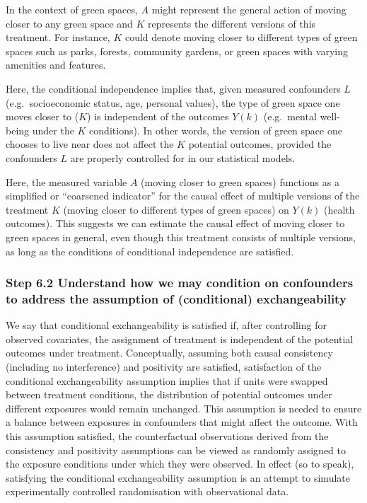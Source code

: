 \documentclass[
  singlecolumn]{article}
\begin{document}
In the context of green spaces, \(A\) might represent the general action
of moving closer to any green space and \(K\) represents the different
versions of this treatment. For instance, \(K\) could denote moving
closer to different types of green spaces such as parks, forests,
community gardens, or green spaces with varying amenities and features.

Here, the conditional independence implies that, given measured
confounders \(L\) (e.g.~socioeconomic status, age, personal values), the
type of green space one moves closer to (\(K\)) is independent of the
outcomes \(Y(k)\) (e.g.~mental well-being under the \(K\) conditions).
In other words, the version of green space one chooses to live near does
not affect the \(K\) potential outcomes, provided the confounders \(L\)
are properly controlled for in our statistical models.

Here, the measured variable \(A\) (moving closer to green spaces)
functions as a simplified or ``coarsened indicator'' for the causal
effect of multiple versions of the treatment \(K\) (moving closer to
different types of green spaces) on \(Y(k)\) (health outcomes). This
suggests we can estimate the causal effect of moving closer to green
spaces in general, even though this treatment consists of multiple
versions, as long as the conditions of conditional independence are
satisfied.

\hypertarget{step-6.2-understand-how-we-may-condition-on-confounders-to-address-the-assumption-of-conditional-exchangeability}{%
\subsubsection{\texorpdfstring{\textbf{Step 6.2 Understand how we may
condition on confounders to address the assumption of (conditional)
exchangeability}}{Step 6.2 Understand how we may condition on confounders to address the assumption of (conditional) exchangeability}}\label{step-6.2-understand-how-we-may-condition-on-confounders-to-address-the-assumption-of-conditional-exchangeability}}

We say that conditional exchangeability is satisfied if, after
controlling for observed covariates, the assignment of treatment is
independent of the potential outcomes under treatment. Conceptually,
assuming both causal consistency (including no interference) and
positivity are satisfied, satisfaction of the conditional
exchangeability assumption implies that if units were swapped between
treatment conditions, the distribution of potential outcomes under
different exposures would remain unchanged. This assumption is needed to
ensure a balance between exposures in confounders that might affect the
outcome. With this assumption satisfied, the counterfactual observations
derived from the consistency and positivity assumptions can be viewed as
randomly assigned to the exposure conditions under which they were
observed. In effect (so to speak), satisfying the conditional
exchangeability assumption is an attempt to simulate experimentally
controlled randomisation with observational data.
\end{document}

